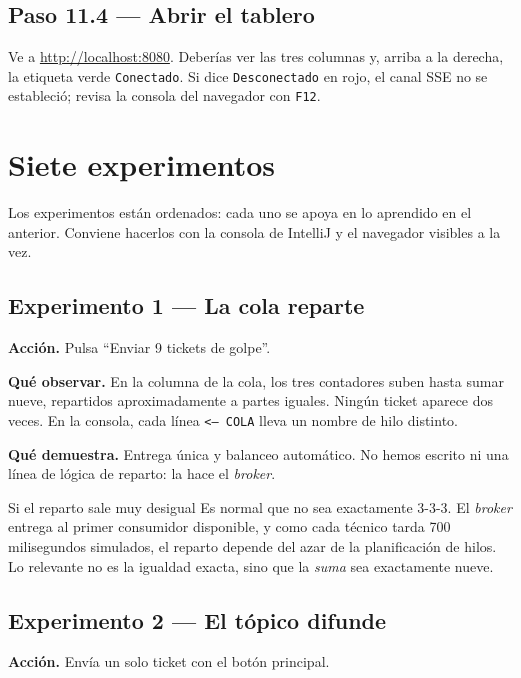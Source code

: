 \documentclass[11pt,a4paper]{book}
\begin{document}
\section{Paso 11.4 --- Abrir el tablero}

Ve a \url{http://localhost:8080}.
Deberías ver las tres columnas y, arriba a la derecha, la etiqueta verde \texttt{Conectado}.
Si dice \texttt{Desconectado} en rojo, el canal SSE no se estableció; revisa la consola del navegador con \texttt{F12}.

\chapter{Siete experimentos}
\label{cap:experimentos}

Los experimentos están ordenados: cada uno se apoya en lo aprendido en el anterior.
Conviene hacerlos con la consola de IntelliJ y el navegador visibles a la vez.

\section{Experimento 1 --- La cola reparte}

\textbf{Acción.} Pulsa ``Enviar 9 tickets de golpe''.

\textbf{Qué observar.} En la columna de la cola, los tres contadores suben hasta sumar nueve, repartidos aproximadamente a partes iguales.
Ningún ticket aparece dos veces.
En la consola, cada línea \texttt{<-- COLA} lleva un nombre de hilo distinto.

\textbf{Qué demuestra.} Entrega única y balanceo automático.
No hemos escrito ni una línea de lógica de reparto: la hace el \emph{broker}.

\begin{cajaTip}{Si el reparto sale muy desigual}
	Es normal que no sea exactamente 3-3-3.
	El \emph{broker} entrega al primer consumidor disponible, y como cada técnico tarda 700 milisegundos simulados, el reparto depende del azar de la planificación de hilos.
	Lo relevante no es la igualdad exacta, sino que la \emph{suma} sea exactamente nueve.
\end{cajaTip}

\section{Experimento 2 --- El tópico difunde}

\textbf{Acción.} Envía un solo ticket con el botón principal.
\end{document}
